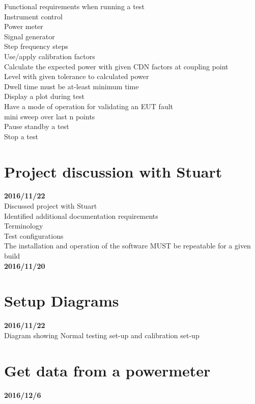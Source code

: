 Functional requirements when running a test\\
Instrument control\\
  Power meter\\
  Signal generator\\
Step frequency steps\\
Use/apply calibration factors\\
Calculate the expected power with given CDN factors at coupling point\\
Level with given tolerance to calculated power\\
Dwell time must be at-least minimum time\\
Display a plot during test\\
Have a mode of operation for validating an EUT fault\\
  mini sweep over last n points\\
Pause standby a test\\
Stop a test\\


\section{Project discussion with Stuart}\textbf{2016/11/22}\\
Discussed project with Stuart\\
Identified additional documentation requirements\:\\
Terminology\\
Test configurations\\
The installation and operation of the software MUST be repeatable for a given build\\
\textbf{2016/11/20}\\


\newpage
\section{Setup Diagrams}\textbf{2016/11/22}\\
Diagram showing Normal testing set-up and calibration set-up\\



\section{Get data from a powermeter}\textbf{2016/12/6}\\


